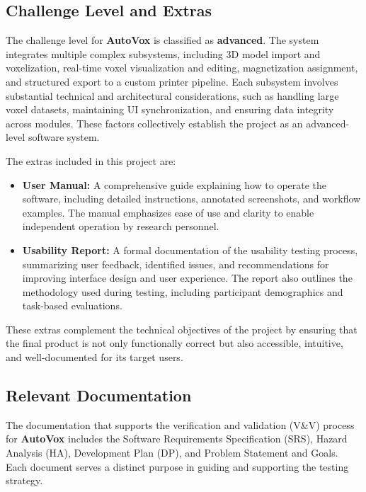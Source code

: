 \documentclass[12pt, titlepage]{article}
\begin{document}
\subsection{Challenge Level and Extras}

The challenge level for \textbf{AutoVox} is classified as \textbf{advanced}. The system integrates multiple complex subsystems, including 3D model import and voxelization, real-time voxel visualization and editing, magnetization assignment, and structured export to a custom printer pipeline. Each subsystem involves substantial technical and architectural considerations, such as handling large voxel datasets, maintaining UI synchronization, and ensuring data integrity across modules. These factors collectively establish the project as an advanced-level software system.

The extras included in this project are:

\begin{itemize}
  \item \textbf{User Manual:} A comprehensive guide explaining how to operate the software, including detailed instructions, annotated screenshots, and workflow examples. The manual emphasizes ease of use and clarity to enable independent operation by research personnel.
  \item \textbf{Usability Report:} A formal documentation of the usability testing process, summarizing user feedback, identified issues, and recommendations for improving interface design and user experience. The report also outlines the methodology used during testing, including participant demographics and task-based evaluations.
\end{itemize}

These extras complement the technical objectives of the project by ensuring that the final product is not only functionally correct but also accessible, intuitive, and well-documented for its target users.

\subsection{Relevant Documentation}



\citet{SRS}

The documentation that supports the verification and validation (V\&V) process for \textbf{ AutoVox} includes the Software Requirements Specification (SRS), Hazard Analysis (HA), Development Plan (DP), and Problem Statement and Goals. Each document serves a distinct purpose in guiding and supporting the testing strategy.
\end{document}
